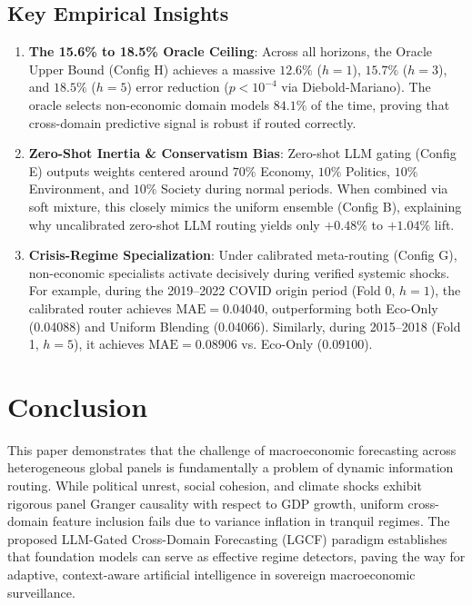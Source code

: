 \documentclass[11pt,a4paper]{article}
\begin{document}
\subsection{Key Empirical Insights}
\begin{enumerate}
    \item \textbf{The 15.6\% to 18.5\% Oracle Ceiling}: Across all horizons, the Oracle Upper Bound (Config H) achieves a massive $12.6\%$ ($h=1$), $15.7\%$ ($h=3$), and $18.5\%$ ($h=5$) error reduction ($p < 10^{-4}$ via Diebold-Mariano). The oracle selects non-economic domain models $84.1\%$ of the time, proving that cross-domain predictive signal is robust if routed correctly.
    \item \textbf{Zero-Shot Inertia \& Conservatism Bias}: Zero-shot LLM gating (Config E) outputs weights centered around $70\%$ Economy, $10\%$ Politics, $10\%$ Environment, and $10\%$ Society during normal periods. When combined via soft mixture, this closely mimics the uniform ensemble (Config B), explaining why uncalibrated zero-shot LLM routing yields only $+0.48\%$ to $+1.04\%$ lift.
    \item \textbf{Crisis-Regime Specialization}: Under calibrated meta-routing (Config G), non-economic specialists activate decisively during verified systemic shocks. For example, during the 2019--2022 COVID origin period (Fold 0, $h=1$), the calibrated router achieves $\text{MAE} = 0.04040$, outperforming both Eco-Only (0.04088) and Uniform Blending (0.04066). Similarly, during 2015--2018 (Fold 1, $h=5$), it achieves $\text{MAE} = 0.08906$ vs. Eco-Only ($0.09100$).
\end{enumerate}

\section{Conclusion}
This paper demonstrates that the challenge of macroeconomic forecasting across heterogeneous global panels is fundamentally a problem of dynamic information routing. While political unrest, social cohesion, and climate shocks exhibit rigorous panel Granger causality with respect to GDP growth, uniform cross-domain feature inclusion fails due to variance inflation in tranquil regimes. The proposed LLM-Gated Cross-Domain Forecasting (LGCF) paradigm establishes that foundation models can serve as effective regime detectors, paving the way for adaptive, context-aware artificial intelligence in sovereign macroeconomic surveillance.



\end{document}
